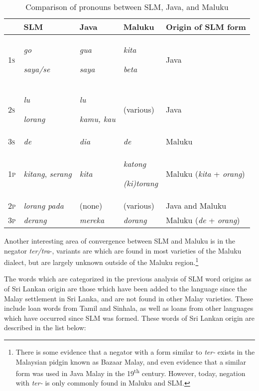 \begin{table}

\begin{tabular}{lllll}
 &
\textbf{SLM} &
\textbf{Java} &
\textbf{Maluku} &
\textbf{Origin of SLM form}\\\hline
1\textsc{s} &
\textit{go}

\textit{saya/se} &
\textit{gua}

\textit{saya} &
\textit{kita}

\textit{beta} &
Java\\
2\textsc{s} &
\textit{lu}

\textit{lorang} &
\textit{lu}

\textit{kamu, kau} &
(various) &
Java\\
3\textsc{s} &
\textit{de} &
\textit{dia} &
\textit{de} &
Maluku\\
1\textsc{p} &
\textit{kitang}, \textit{serang} &
\textit{kita } &
\textit{katong}

\textit{(ki)torang} &
Maluku (\textit{kita} + \textit{orang})\\
2\textsc{p} &
\textit{lorang pada} &
(none) &
(various) &
Java and Maluku\\
3\textsc{p} &
\textit{derang} &
\textit{mereka} &
\textit{dorang} &
Maluku (\textit{de} + \textit{orang})\\
\end{tabular}
\caption{Comparison of pronouns  between SLM, Java, and Maluku}
\label{paauw:tab:pronounsslmjavamaluku}
\end{table}

Another interesting area of convergence between SLM and Maluku is in the negator \textit{ter/tra}{}-, variants are which are found in most varieties of the Maluku dialect, but are largely unknown outside of the Maluku region.\footnote{There
 is some evidence that a negator with a form similar to \textit{ter-} exists in the Malaysian pidgin known as Bazaar Malay, and even evidence that a similar form was used in Java Malay in the 19\textsuperscript{th} century. However, today, negation with \textit{ter-} is only commonly found in Maluku and SLM. 
} 

The words which are categorized in the previous analysis of SLM word origins as of Sri Lankan origin are those which have been added to the language since the Malay settlement in Sri Lanka, and are not found in other Malay varieties. These include loan words from Tamil and Sinhala, as well as loans from other languages which have occurred since SLM was formed. These words of Sri Lankan origin are described in the list below:

